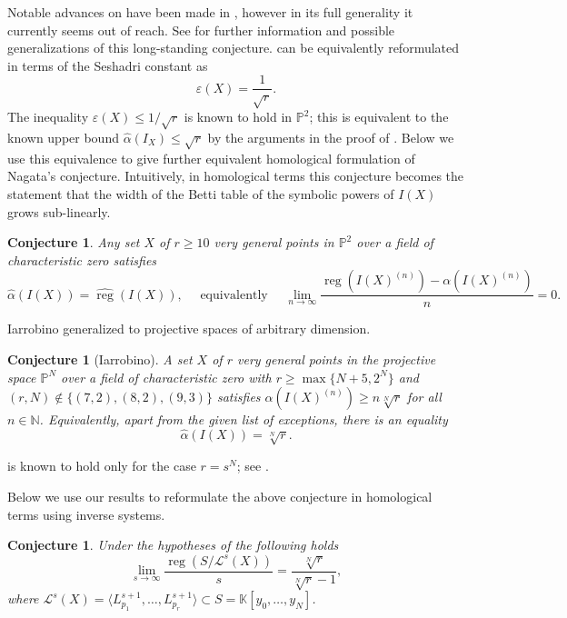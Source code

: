 \documentclass[12pt, reqno]{amsart}
\numberwithin{equation}{section}
\def\e{\ensuremath{\varepsilon}}
\newcommand{\wa}{\widehat{\alpha}}
\newcommand{\N}{{\mathbb N}}
\renewcommand{\P}{{\mathbb P}}
\newcommand{\kk}{\mathbb{K}}
\renewcommand{\L}{{\mathcal L}}
\DeclareMathOperator{\reg}{reg}
\theoremstyle{plain} %
\newtheorem{conj}[thm]{Conjecture}
\theoremstyle{definition}
\theoremstyle{remark}
\renewcommand{\L}{\mathcal{L}}
\begin{document}
Notable advances on   have been made in \cite{Xu, Tutaj,Harbourne01, HarbourneRoe08}, however in its full generality it currently seems out of reach. See \cite{CHMR13} for further information and possible generalizations of this long-standing conjecture. 
 can be equivalently reformulated in terms of the Seshadri constant as
\begin{equation}
\label{eq:nagseshadri}
\e(X)=\frac{1}{\sqrt{r}}.
\end{equation}
The inequality $\e(X)\leq 1/\sqrt{r}$ is known to hold in $\P^2$; this is equivalent to the known upper bound $\widehat{\alpha}(I_X)\leq \sqrt{r}$  by the arguments in the proof of .
Below we use this equivalence  to give further equivalent homological formulation of Nagata's conjecture. 
Intuitively, in homological terms this conjecture becomes the statement that the width of the Betti table of the symbolic powers of $I(X)$ grows sub-linearly.
 
 \begin{conj}
 \label{conj:homolNag}
 Any set $X$ of $r\geq 10$ very general points in $\P^2$ over a field of characteristic zero satisfies  
 \[
 \widehat{\alpha}(I(X))=\widehat{\reg}(I(X)),
 \quad 
\text{ equivalently }
\quad
 \lim_{n\to\infty} \frac{\reg(I(X)^{(n)})-\alpha(I(X)^{(n)})}{n}=0.
 \]
 \end{conj}
 


\noindent Iarrobino \cite{iarrobino97} generalized  to projective spaces of arbitrary dimension.

\begin{conj}[Iarrobino]
\label{conj:Iar}
A set $X$ of $r$ very general points in the projective space $\P^N$ over a field of characteristic zero with $r\geq \max\{N+5, 2^N\}$ and $(r,N)\not \in\{(7,2), (8,2), (9,3)\}$ satisfies $\alpha(I(X)^{(n)})\geq n\sqrt[N]{r}$  for all  $n\in \N$. Equivalently, apart from the given list of exceptions, there is an equality 
\[
\wa(I(X))=\sqrt[N]{r}.
\]
\end{conj}

 is known to hold only for the case $r=s^N$; see \cite{Evain}. 

Below we use our results to reformulate the above conjecture  in homological terms  using inverse systems.

 \begin{conj}
 	\label{conj:inverseNag}
 Under the hypotheses of  the following holds
	 	\[
 	\lim_{s\to\infty} \frac{\reg(S/\L^s(X))}{s}=\frac{\sqrt[N]{r}}{\sqrt[N]{r}-1},
 	\]
 	where $\L^s(X)=\langle L_{p_1}^{s+1},\ldots,L_{p_r}^{s+1}\rangle \subset S=\kk[y_0,\ldots, y_N]$.
 \end{conj}
 
\end{document}
